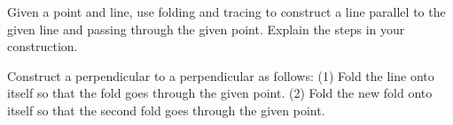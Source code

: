 \documentclass[nooutcomes]{ximera}
\begin{document}
\begin{problem}
Given a point and line, use folding and tracing to construct a line parallel
  to the given line and passing through the given point. Explain the
  steps in your construction.
\begin{hint}
Construct a perpendicular to a perpendicular as follows:  (1) Fold the line onto itself so that the fold goes through the given point. 
(2) Fold the new fold onto itself so that the second fold goes through the given point.
\end{hint}
\end{problem}

%
%
%
%
%
%
%

\end{document}

